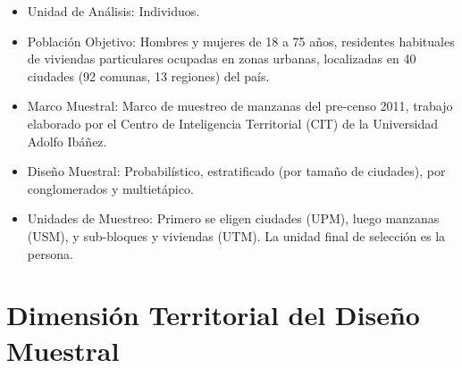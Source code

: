 \documentclass[
  12pt,
]{book}
\begin{document}
\begin{itemize}
\item
  Unidad de Análisis: Individuos.
\item
  Población Objetivo: Hombres y mujeres de 18 a 75 años, residentes habituales de viviendas particulares ocupadas en zonas urbanas, localizadas en 40 ciudades (92 comunas, 13 regiones) del país.
\item
  Marco Muestral: Marco de muestreo de manzanas del pre-censo 2011, trabajo elaborado por el Centro de Inteligencia Territorial (CIT) de la Universidad Adolfo Ibáñez.
\item
  Diseño Muestral: Probabilístico, estratificado (por tamaño de ciudades), por conglomerados y multietápico.
\item
  Unidades de Muestreo: Primero se eligen ciudades (UPM), luego manzanas (USM), y sub-bloques y viviendas (UTM). La unidad final de selección es la persona.
\end{itemize}

\hypertarget{dimensiuxf3n-territorial-del-diseuxf1o-muestral}{%
\section{Dimensión Territorial del Diseño Muestral}\label{dimensiuxf3n-territorial-del-diseuxf1o-muestral}}
\end{document}

